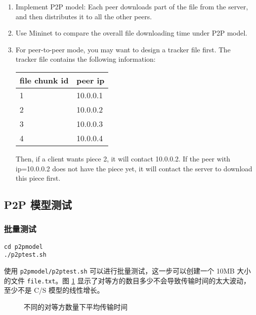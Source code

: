 \begin{enumerate}
    \item Implement P2P model: Each peer downloads part of the file from the server, and then distributes it to all the other peers.

    \item Use Mininet to compare the overall file downloading time under P2P model.
    
    \item For peer-to-peer mode, you may want to design a tracker file first. The tracker file contains the following information:
    
    \begin{table}[H]
    \centering
    \begin{tabular}{ll}
        \toprule
        file chunk id & peer ip \\
        \midrule
        1 & 10.0.0.1\\
        2 & 10.0.0.2\\
        3 & 10.0.0.3\\
        4 & 10.0.0.4\\
        \bottomrule
    \end{tabular}
    \end{table}

    Then, if a client wants piece 2, it will contact 10.0.0.2. If the peer with ip=10.0.0.2 does not have the piece yet, it will contact the server to download this piece first. 
\end{enumerate}

\subsection{P2P 模型测试}

\subsubsection{批量测试}

\begin{lstlisting}[style=commandshell]
cd p2pmodel
./p2ptest.sh
\end{lstlisting}

使用 \verb"p2pmodel/p2ptest.sh" 可以进行批量测试，这一步可以创建一个 10MB 大小的文件 \verb"file.txt"。图 \ref{fig:p2pmodelstat} 显示了对等方的数目多少不会导致传输时间的太大波动，至少不是 C/S 模型的线性增长。

\begin{figure}[H]
    \centering
    \caption{不同的对等方数量下平均传输时间}\label{fig:p2pmodelstat}
\end{figure}

